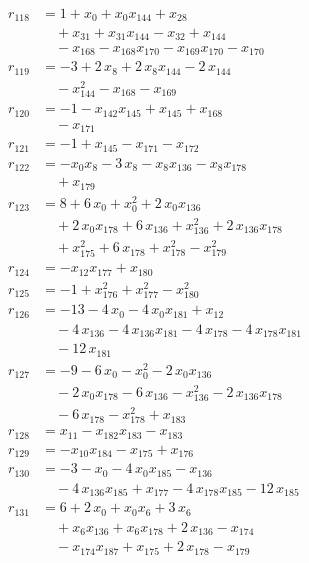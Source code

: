 \begin{align*}
r_{118} &= 1 + x_{0} + x_{0} x_{144} + x_{28} \\
&\quad{}+ x_{31} + x_{31} x_{144} - x_{32} + x_{144} \\
&\quad{}- x_{168} - x_{168} x_{170} - x_{169} x_{170} - x_{170} \\
r_{119} &= -3 + 2\,x_{8} + 2\,x_{8} x_{144} - 2\,x_{144} \\
&\quad{}- x_{144}^{2} - x_{168} - x_{169} \\
r_{120} &= -1 - x_{142} x_{145} + x_{145} + x_{168} \\
&\quad{}- x_{171} \\
r_{121} &= -1 + x_{145} - x_{171} - x_{172} \\
r_{122} &= -x_{0} x_{8} - 3\,x_{8} - x_{8} x_{136} - x_{8} x_{178} \\
&\quad{}+ x_{179} \\
r_{123} &= 8 + 6\,x_{0} + x_{0}^{2} + 2\,x_{0} x_{136} \\
&\quad{}+ 2\,x_{0} x_{178} + 6\,x_{136} + x_{136}^{2} + 2\,x_{136} x_{178} \\
&\quad{}+ x_{175}^{2} + 6\,x_{178} + x_{178}^{2} - x_{179}^{2} \\
r_{124} &= -x_{12} x_{177} + x_{180} \\
r_{125} &= -1 + x_{176}^{2} + x_{177}^{2} - x_{180}^{2} \\
r_{126} &= -13 - 4\,x_{0} - 4\,x_{0} x_{181} + x_{12} \\
&\quad{}- 4\,x_{136} - 4\,x_{136} x_{181} - 4\,x_{178} - 4\,x_{178} x_{181} \\
&\quad{}- 12\,x_{181} \\
r_{127} &= -9 - 6\,x_{0} - x_{0}^{2} - 2\,x_{0} x_{136} \\
&\quad{}- 2\,x_{0} x_{178} - 6\,x_{136} - x_{136}^{2} - 2\,x_{136} x_{178} \\
&\quad{}- 6\,x_{178} - x_{178}^{2} + x_{183} \\
r_{128} &= x_{11} - x_{182} x_{183} - x_{183} \\
r_{129} &= -x_{10} x_{184} - x_{175} + x_{176} \\
r_{130} &= -3 - x_{0} - 4\,x_{0} x_{185} - x_{136} \\
&\quad{}- 4\,x_{136} x_{185} + x_{177} - 4\,x_{178} x_{185} - 12\,x_{185} \\
r_{131} &= 6 + 2\,x_{0} + x_{0} x_{6} + 3\,x_{6} \\
&\quad{}+ x_{6} x_{136} + x_{6} x_{178} + 2\,x_{136} - x_{174} \\
&\quad{}- x_{174} x_{187} + x_{175} + 2\,x_{178} - x_{179} \\

\end{align*}
